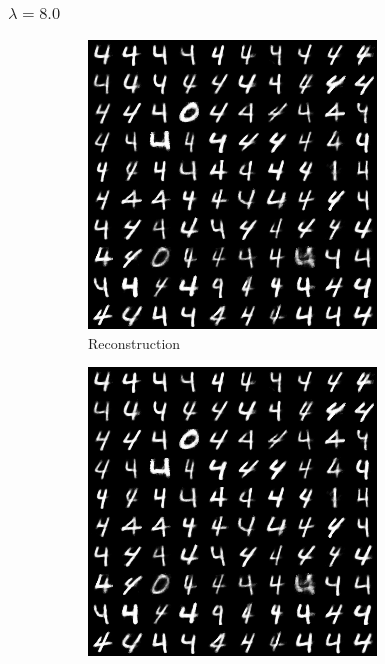 \documentclass{beamer}
\theoremstyle{plain}
\theoremstyle{definition}
\theoremstyle{remark}
\begin{document}
\begin{frame}
	\frametitle{$\lambda=8.0$}
	\begin{figure}
		\centering
		\begin{subfigure}[b]{0.3\textwidth}
			\centering
			\includegraphics[width=\textwidth]{Images/l21R_8.png}
			\caption{Reconstruction}
		\end{subfigure}
		\hfill
		\begin{subfigure}[b]{0.3\textwidth}
			\centering
			\includegraphics[width=\textwidth]{Images/l21L_8.png}

\end{subfigure}
\end{figure}
\end{frame}
\end{document}
